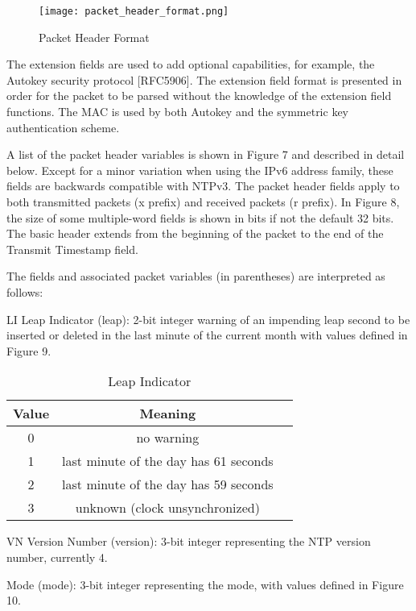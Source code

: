 \begin{figure}
\centering
\texttt{[image: packet\_header\_format.png]}
\caption{Packet Header Format}
\label{packet_header_format}
\end{figure}

The extension fields are used to add optional capabilities, for
example, the Autokey security protocol [RFC5906]. The extension
field format is presented in order for the packet to be parsed
without the knowledge of the extension field functions. The MAC is
used by both Autokey and the symmetric key authentication scheme.

A list of the packet header variables is shown in Figure 7 and
described in detail below. Except for a minor variation when using
the IPv6 address family, these fields are backwards compatible with
NTPv3. The packet header fields apply to both transmitted packets (x
prefix) and received packets (r prefix). In Figure 8, the size of
some multiple-word fields is shown in bits if not the default 32
bits. The basic header extends from the beginning of the packet to
the end of the Transmit Timestamp field.

The fields and associated packet variables (in parentheses) are
interpreted as follows:

LI Leap Indicator (leap): 2-bit integer warning of an impending leap
second to be inserted or deleted in the last minute of the current
month with values defined in Figure 9.

\begin{table}[htb]
\center
\begin{tabular}{c | c | c}
Value & Meaning \\
\hline
\hline
0 & no warning \\
1 & last minute of the day has 61 seconds \\
2 & last minute of the day has 59 seconds \\
3 & unknown (clock unsynchronized) \\
\hline
\end{tabular}
\label{leap_indicator}
\caption{Leap Indicator}
\end{table}

VN Version Number (version): 3-bit integer representing the NTP
version number, currently 4.

Mode (mode): 3-bit integer representing the mode, with values defined
in Figure 10.

